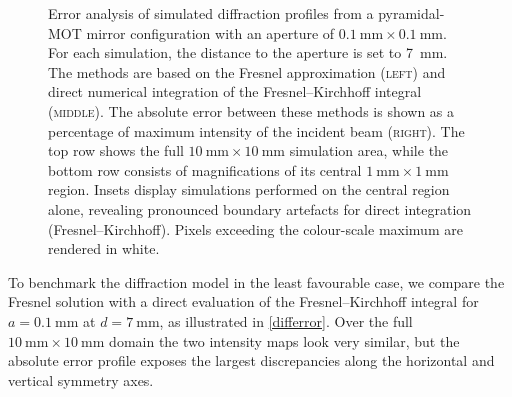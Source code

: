 \documentclass[../Thesis-IJspeert.tex]{subfiles}
\begin{document}
\begin{figure}[!t]
	\caption[Error analysis of simulated diffraction profiles from a pyra\-midal-MOT mirror configuration]{Error analysis of simulated diffraction profiles from a pyramidal-MOT mirror configuration with an aperture of $\SI{0.1}{\milli\meter}\times\SI{0.1}{\milli\meter}$. For each simulation, the distance to the aperture is set to \SI{7}{\milli\meter}. The methods are based on the Fresnel approximation \textsc{(left)} and direct numerical integration of the Fresnel--Kirchhoff integral \textsc{(middle)}. The absolute error between these methods is shown as a percentage of maximum intensity of the incident beam \textsc{(right)}. The top row shows the full $\SI{10}{\milli\metre}\times\SI{10}{\milli\metre}$ simulation area, while the bottom row consists of magnifications of its central $\SI{1}{\milli\metre}\times\SI{1}{\milli\metre}$ region. Insets display simulations performed on the central region alone, revealing pronounced boundary artefacts for direct integration (Fresnel--Kirchhoff). Pixels exceeding the colour-scale maximum are rendered in white.
	}
	\label{differror}
\end{figure}
To benchmark the diffraction model in the least favourable case, we compare the Fresnel solution with a direct evaluation of the Fresnel--Kirchhoff integral for $a=\SI{0.1}{\milli\metre}$ at $d=\SI{7}{\milli\metre}$, as illustrated in \autoref{differror}. Over the full $\SI{10}{\milli\metre}\times\SI{10}{\milli\metre}$ domain the two intensity maps look very similar, but the absolute error profile exposes the largest discrepancies along the horizontal and vertical symmetry axes.
\end{document}
